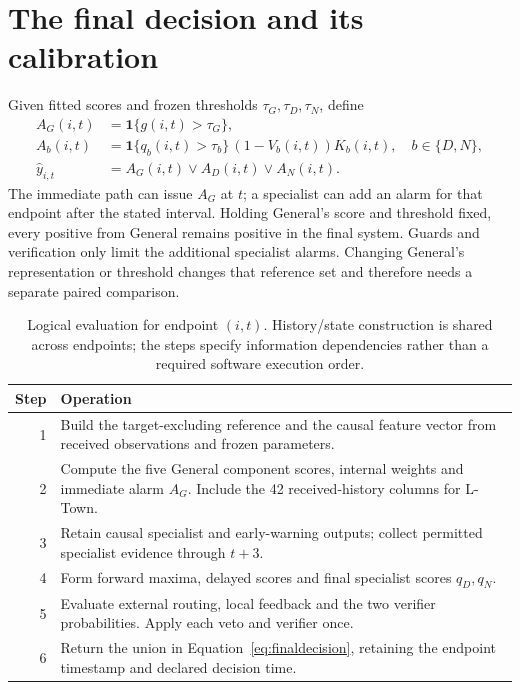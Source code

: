 \section{The final decision and its calibration}
Given fitted scores and frozen thresholds $\tau_G,\tau_D,\tau_N$, define
\begin{align}
 A_G(i,t)&=\mathbf1\{g(i,t)>\tau_G\},\\
 A_b(i,t)&=\mathbf1\{q_b(i,t)>\tau_b\}\,(1-V_b(i,t))K_b(i,t),\quad b\in\{D,N\},\\
 \widehat y_{i,t}&=A_G(i,t)\lor A_D(i,t)\lor A_N(i,t).
 \label{eq:finaldecision}
\end{align}
The immediate path can issue $A_G$ at $t$; a specialist can add an alarm for that endpoint after the stated interval. Holding General's score and threshold fixed, every positive from General remains positive in the final system. Guards and verification only limit the additional specialist alarms. Changing General's representation or threshold changes that reference set and therefore needs a separate paired comparison.

\begin{table}[tbp]
\centering\small
\caption[Computation of one endpoint decision]{Logical evaluation for endpoint $(i,t)$. History/state construction is shared across endpoints; the steps specify information dependencies rather than a required software execution order.}
\label{tab:algorithm}
\begin{tabularx}{\linewidth}{@{}rY@{}}
\toprule
Step & Operation\\
 & Build the target-excluding reference and the causal feature vector from received observations and frozen parameters.\\
2 & Compute the five General component scores, internal weights and immediate alarm $A_G$. Include the 42 received-history columns for L-Town.\\
3 & Retain causal specialist and early-warning outputs; collect permitted specialist evidence through $t+3$.\\
4 & Form forward maxima, delayed scores and final specialist scores $q_D,q_N$.\\
5 & Evaluate external routing, local feedback and the two verifier probabilities. Apply each veto and verifier once.\\
6 & Return the union in Equation~\eqref{eq:finaldecision}, retaining the endpoint timestamp and declared decision time.\\
\bottomrule
\end{tabularx}
\end{table}

